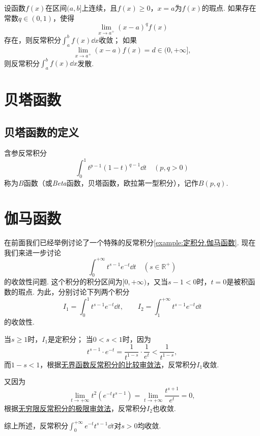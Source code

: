 \begin{theorem}[极限审敛法]\label{theorem:定积分.无界函数的反常积分的极限审敛法}
设函数\(f(x)\)在区间\((a,b]\)上连续，且\(f(x) \geqslant 0\)，\(x=a\)为\(f(x)\)的瑕点.
如果存在常数\(q \in (0,1)\)，使得\[
\lim\limits_{x \to a^+} (x-a)^q f(x)
\]存在，则反常积分\(\int_a^b f(x) \dd{x}\)收敛；
如果\[
\lim\limits_{x \to a^+} (x-a) f(x) = d \in (0,+\infty],
\]则反常积分\(\int_a^b f(x) \dd{x}\)发散.
\end{theorem}

\section{贝塔函数}
\subsection{贝塔函数的定义}
\begin{definition}
含参反常积分\begin{equation}
\int_0^1 t^{p-1} (1-t)^{q-1} \dd{t}
\quad(p,q>0)
\end{equation}称为\(B\)函数（或\textit{Beta}函数，贝塔函数，欧拉第一型积分），记作\(B(p,q)\).
\end{definition}

\section{伽马函数}
在前面我们已经举例讨论了一个特殊的反常积分\cref{example:定积分.伽马函数}.
现在我们来进一步讨论\[
\int_0^{+\infty} t^{s-1} e^{-t} \dd{t} \quad(s\in\mathbb{R}^+)
\]的收敛性问题.
这个积分的积分区间为\([0,+\infty)\)，又当\(s-1<0\)时，\(t=0\)是被积函数的瑕点.
为此，分别讨论下列两个积分\[
I_1 = \int_0^1 t^{s-1} e^{-t} \dd{t},
\qquad
I_2 = \int_1^{+\infty} t^{s-1} e^{-t} \dd{t}
\]的收敛性.

当\(s \geqslant 1\)时，\(I_1\)是定积分；
当\(0 < s < 1\)时，因为\[
t^{s-1} \cdot e^{-t} = \frac{1}{t^{1-s}} \cdot \frac{1}{e^t} < \frac{1}{t^{1-s}},
\]而\(1-s < 1\)，根据\hyperref[theorem:定积分.无界函数的反常积分的比较审敛法]{无界函数反常积分的比较审敛法}，反常积分\(I_1\)收敛.

又因为\[
\lim\limits_{t\to+\infty} t^2 (e^{-t} t^{s-1})
= \lim\limits_{t\to+\infty} \frac{t^{s+1}}{e^t} = 0,
\]根据\hyperref[theorem:定积分.无穷限反常积分的极限审敛法]{无穷限反常积分的极限审敛法}，反常积分\(I_2\)也收敛.

综上所述，反常积分\(\int_0^{+\infty} e^{-t} t^{s-1} \dd{t}\)对\(s > 0\)均收敛.

